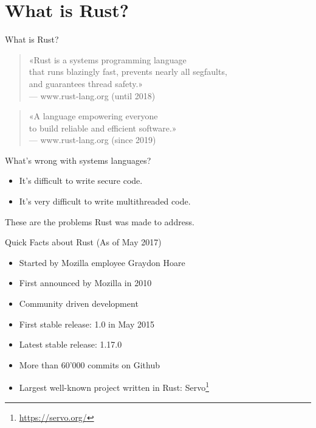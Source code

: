 \section{What is Rust?}


\begin{frame}[c]{What is Rust?}
	\begin{quote}
		«Rust is a systems programming language\\
		that runs blazingly fast, prevents nearly all segfaults,\\
		and guarantees thread safety.»\\
		\vspace{0.5em}
		{\normalfont \small --- www.rust-lang.org (until 2018)}
	\end{quote}

	\vspace{2em}

	\begin{quote}
		«A language empowering everyone\\
		to build reliable and efficient software.»\\
		\vspace{0.5em}
		{\normalfont \small --- www.rust-lang.org (since 2019)}
	\end{quote}
\end{frame}


\begin{frame}{What's wrong with systems languages?}
	\begin{itemize}
		\item It's difficult to write secure code.
		\item It's very difficult to write multithreaded code.
	\end{itemize}
	These are the problems Rust was made to address.
\end{frame}


\begin{frame}{Quick Facts about Rust}
	(As of May 2017)
	\begin{itemize}
		\item Started by Mozilla employee Graydon Hoare
		\item First announced by Mozilla in 2010
		\item Community driven development
		\item First stable release: 1.0 in May 2015
		\item Latest stable release: 1.17.0
		\item More than 60'000 commits on Github
		\item Largest well-known project written in Rust: Servo\footnote{\url{https://servo.org/}}
	\end{itemize}
\end{frame}

